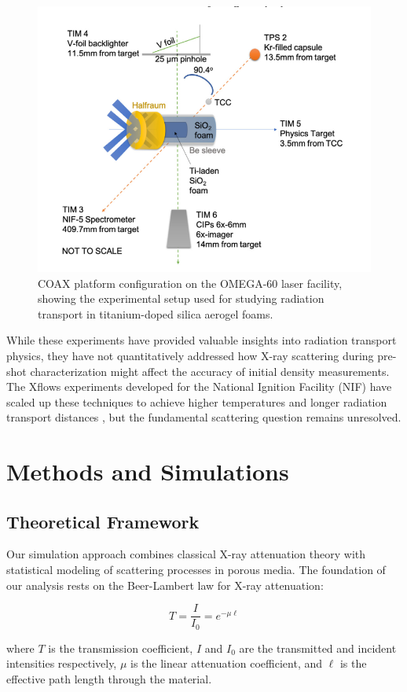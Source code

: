 \documentclass[twocolumn]{aastex701}
\begin{document}
\begin{figure}[t]
    \centering
    \includegraphics[width=0.45\linewidth]{coaxplatform.png}
    \caption{COAX platform configuration on the OMEGA-60 laser facility, showing the experimental setup used for studying radiation transport in titanium-doped silica aerogel foams.}
    \label{fig:coaxplatform}
\end{figure}

While these experiments have provided valuable insights into radiation transport physics, they have not quantitatively addressed how X-ray scattering during pre-shot characterization might affect the accuracy of initial density measurements. The Xflows experiments developed for the National Ignition Facility (NIF) have scaled up these techniques to achieve higher temperatures and longer radiation transport distances \citep{Johns_Byvank_Robey_Urbatsch_Coffing_Fryer_Perry_Kozlowski_Fontes_Love_et_al._2023}, but the fundamental scattering question remains unresolved.

\section{Methods and Simulations}

\subsection{Theoretical Framework}

Our simulation approach combines classical X-ray attenuation theory with statistical modeling of scattering processes in porous media. The foundation of our analysis rests on the Beer-Lambert law for X-ray attenuation:

\begin{equation}
\label{eq:BL Law}
    T = \frac{I}{I_0} = e^{-\mu \ell}
\end{equation}

where $T$ is the transmission coefficient, $I$ and $I_0$ are the transmitted and incident intensities respectively, $\mu$ is the linear attenuation coefficient, and $\ell$ is the effective path length through the material.
\end{document}
